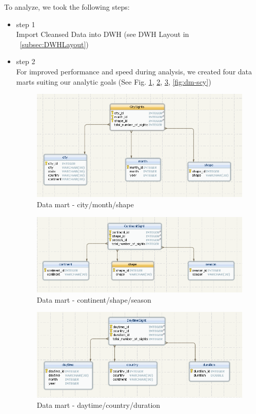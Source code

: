 \documentclass[11pt, journal]{IEEEtran}
\begin{document}
To analyze, we took the following steps:
\begin{itemize}
    \item step 1\\
    Import Cleansed Data into DWH (see DWH Layout in ~\ref{subsec:DWHLayout})
    \item step 2\\
    For improved performance and speed during analysis, we created four data marts suiting our analytic goals (See Fig. \ref{fig:dm-cms}, \ref{fig:dm-css}, \ref{fig:dm-dcd}, \ref{fig:dm-scy})
      
    \begin{figure}[H]
        \centering
            \includegraphics[width=1.0\columnwidth]{images/city-month-shape}
        \caption{Data mart - city/month/shape}
        \label{fig:dm-cms}
    \end{figure}

     \begin{figure}[H]
            \centering
	            \includegraphics[width=1.0\columnwidth]{images/continent-shape-season}
            \caption{Data mart - continent/shape/season}
            \label{fig:dm-css}
        \end{figure}

     \begin{figure}[H]
        \centering
            \includegraphics[width=1.0\columnwidth]{images/daytime-country-duration}
        \caption{Data mart - daytime/country/duration}
        \label{fig:dm-dcd}
    \end{figure}


\end{itemize}
\end{document}
